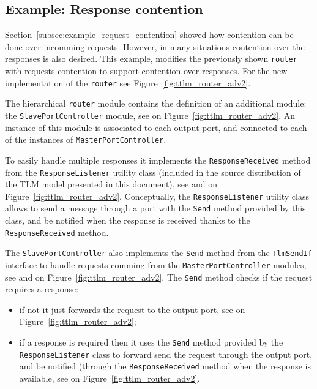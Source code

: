 \subsection{Example: Response contention}
\label{subsec:example_response_contention}
Section~\ref{subsec:example_request_contention} showed how contention
can be done over incomming requests. However, in many situations
contention over the responses is also desired. This example, modifies
the previously shown \texttt{router} with requests contention to
support contention over responses. For the new implementation of the
\texttt{router} see Figure~\ref{fig:ttlm_router_adv2}.

The \hfill hierarchical \hfill \texttt{router} \hfill module \hfill contains \hfill the \hfill definition \hfill of \hfill an \hfill additional \hfill module: the \texttt{SlavePortController} module, see
{\large {}} on Figure~\ref{fig:ttlm_router_adv2}. An instance
of this module is associated to each output port, and connected to
each of the instances of \texttt{MasterPortController}.

To easily handle multiple responses it implements the
\texttt{ResponseReceived} method from the \texttt{ResponseListener}
utility class (included in the source distribution of the TLM model
presented in this document), see {\large {}} and {\large
  } on Figure~\ref{fig:ttlm_router_adv2}.  Conceptually, the
\texttt{ResponseListener} utility class allows to send a message
through a port with the \texttt{Send} method provided by this class,
and be notified when the response is received thanks to the
\texttt{ResponseReceived} method.

The \texttt{SlavePortController} also implements the \texttt{Send}
method from the \texttt{TlmSendIf} interface to handle requests
comming from the \texttt{MasterPortController} modules, see {\large
  } and {\large {}} on
Figure~\ref{fig:ttlm_router_adv2}. The \texttt{Send} method checks if
the request requires a response:
\begin{itemize}
\item if not it just forwards the request to the output port, see
  {\large {}} on Figure~\ref{fig:ttlm_router_adv2};
\item if a response is required then it uses the \texttt{Send} method
  provided by the \texttt{ResponseListener} class to forward send the
  request through the output port, and be notified (through the
  \texttt{ResponseReceived} method when the response is available, see
  {\large {}} on Figure~\ref{fig:ttlm_router_adv2}.
\end{itemize}

